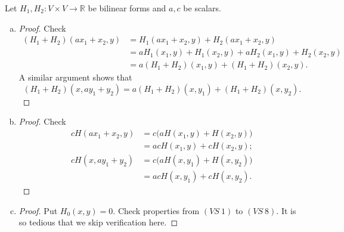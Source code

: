 \begin{Exercise}
	Let $H_1, H_2 : V\times V\to \mathbb{R}$ be bilinear forms and $a,c$ be scalars.
	\begin{enumerate}[(a)]
		\item
		\begin{proof}
			Check
			\begin{align*}
			(H_1+H_2)(ax_1+x_2,y)
			&= H_1(ax_1+x_2,y) + H_2(ax_1+x_2,y) \\
			&= a H_1(x_1,y) + H_1(x_2,y) + aH_2(x_1,y) + H_2(x_2,y) \\
			&= a(H_1+H_2)(x_1,y) + (H_1+H_2)(x_2,y).
			\end{align*}
			A similar argument shows that 
			$$
			(H_1+H_2)(x,ay_1+y_2)
			=  a(H_1+H_2)(x,y_1) + (H_1+H_2)(x,y_2).
			$$
		\end{proof}
		
		\item
		\begin{proof}
			Check
			\begin{align*}
			c H(ax_1+x_2,y)
			&= c \big( a H(x_1,y) + H(x_2,y) \big) \\
			&= a c H(x_1,y) + c H(x_2,y); \\
			c H(x,ay_1+y_2)
			&= c \big( a H(x,y_1) + H(x,y_2) \big) \\
			&= a c H(x,y_1) + c H(x,y_2).
			\end{align*}
		\end{proof}
		
		\item
		\begin{proof}
			Put $H_0(x,y) = 0$.
			Check properties from $(VS\ 1)$ to $(VS\ 8)$.
			It is so tedious that we skip verification here.
		\end{proof}
	\end{enumerate}
\end{Exercise}